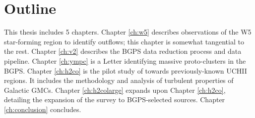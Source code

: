 

\section{Outline}
This thesis includes 5 chapters.
Chapter \ref{ch:w5} describes observations of the W5 star-forming region to identify outflows;
this chapter is somewhat tangential to the rest.
Chapter \ref{ch:v2} describes the BGPS data reduction process and data pipeline.
Chapter \ref{ch:ympc} is a Letter identifying massive proto-clusters in the BGPS.
Chapter \ref{ch:h2co} is the pilot study of \formaldehyde towards previously-known UCHII regions.
It includes the methodology and analysis of turbulent properties of Galactic GMCs.
Chapter \ref{ch:h2colarge} expands upon Chapter \ref{ch:h2co}, detailing the expansion of the \formaldehyde survey
to BGPS-selected sources.
Chapter \ref{ch:conclusion} concludes.



